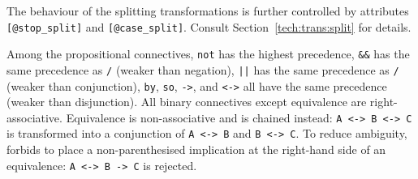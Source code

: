 
The behaviour of the splitting transformations is further
controlled by attributes \texttt{[@stop\_split]} and
\texttt{[@case\_split]}. Consult Section~\ref{tech:trans:split}
for details.

Among the propositional connectives,
\texttt{not} has the highest precedence,
\texttt{\&\&} has the same precedence as \texttt{/}
(weaker than negation),
\texttt{||} has the same precedence as \texttt{/}
(weaker than conjunction),
\texttt{by}, \texttt{so}, \texttt{->}, and \texttt{<->}
all have the same precedence (weaker than disjunction).
All binary connectives except equivalence are right-associative.
Equivalence is non-associative and is chained instead:
\texttt{A <-> B <-> C} is transformed into a conjunction
of \texttt{A <-> B} and \texttt{B <-> C}.
To reduce ambiguity, \whyml forbids to place
a non-parenthesised implication at the right-hand side
of an equivalence: \texttt{A <-> B -> C} is rejected.

